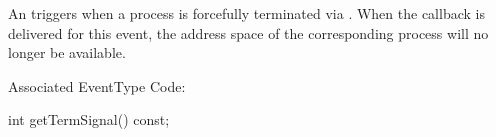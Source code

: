 
An  triggers when a process is forcefully terminated
via . When the callback is delivered for this event,
the address space of the corresponding process will no longer be available.

Associated EventType Code: 

\begin{apient}
int getTermSignal() const;
\end{apient}

